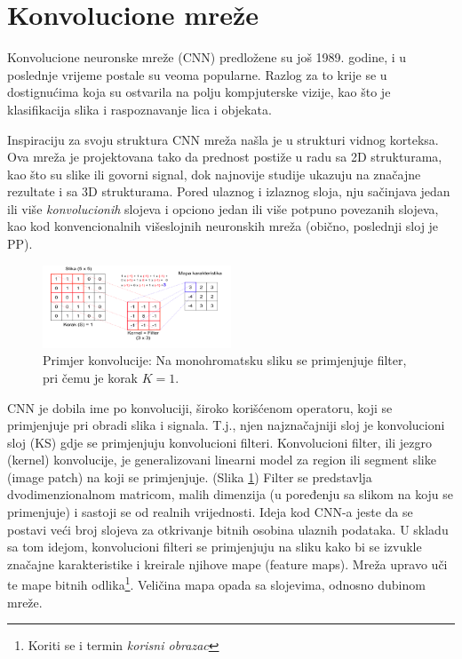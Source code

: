 \documentclass[12pt]{report}
\numberwithin{equation}{section}
\begin{document}
\newpage

\section{Konvolucione mreže}


Konvolucione neuronske mreže (CNN) predložene su još 1989. godine, i u poslednje vrijeme postale su veoma popularne. Razlog za to krije se u dostignućima koja su ostvarila na polju kompjuterske vizije, kao što je klasifikacija slika i raspoznavanje lica i objekata. 

  Inspiraciju za svoju struktura CNN mreža našla je u strukturi vidnog korteksa. Ova mreža je projektovana tako da prednost postiže u radu sa 2D strukturama, kao što su slike ili govorni signal, dok najnovije  studije  ukazuju na značajne rezultate i sa 3D strukturama.  Pored ulaznog i izlaznog sloja, nju sačinjava jedan ili više \textit{konvolucionih} slojeva i opciono jedan ili više potpuno povezanih slojeva,  kao kod konvencionalnih višeslojnih neuronskih  mreža (obično, poslednji sloj je PP).  


   \begin{figure}
\vspace{-20pt}  
  \begin{center}
    \includegraphics[width=0.5\textwidth]{SLIKE/konvolucija}
  \end{center}
  \vspace{-20pt}
  \caption{Primjer konvolucije: Na monohromatsku sliku se primjenjuje filter, pri čemu je korak $K=1$.}
  \label{fig:konvolucija}
  \vspace{-20pt}
\end{figure}

CNN je dobila  ime  po  konvoluciji,  široko  korišćenom operatoru, koji  se  primjenjuje  pri  obradi  slika  i  signala. T.j., njen najznačajniji sloj je konvolucioni sloj (KS) gdje se primjenjuju konvolucioni  filteri.   Konvolucioni  filter, ili jezgro (kernel) konvolucije, je  generalizovani linearni  model za region ili segment slike (image patch)  na  koji se  primjenjuje. (Slika \ref{fig:konvolucija}) Filter se predstavlja dvodimenzionalnom matricom, malih dimenzija (u poređenju sa   slikom   na koju   se   primenjuje)  i   sastoji   se   od   realnih vrijednosti.   Ideja  kod CNN-a  jeste  da  se postavi veći broj slojeva za otkrivanje bitnih  osobina ulaznih podataka.  U  skladu  sa  tom  idejom, konvolucioni  filteri se primjenjuju na sliku kako bi se izvukle značajne karakteristike i kreirale njihove mape  (feature  maps). Mreža upravo uči te mape bitnih odlika\footnote{Koriti se i termin \textit{korisni obrazac}}. Veličina mapa opada sa slojevima, odnosno dubinom mreže. %
\end{document}
